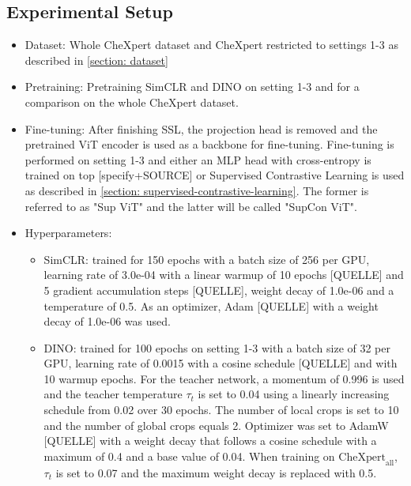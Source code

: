 \subsection{Experimental Setup}
\begin{itemize}
	\item Dataset: Whole CheXpert dataset \citep{Irvin2019} and CheXpert restricted to settings 1-3 as described in \ref{section: dataset}\\
	\item Pretraining: Pretraining SimCLR and DINO on setting 1-3 and for a comparison on the whole CheXpert dataset.\\ 
	\item Fine-tuning: After finishing SSL, the projection head is removed and the pretrained ViT encoder is used as a backbone for fine-tuning.
	Fine-tuning is performed on setting 1-3 and either an MLP head with cross-entropy is trained on top [specify+SOURCE] or Supervised Contrastive Learning is used as described in \ref{section: supervised-contrastive-learning}.
	The former is referred to as "Sup ViT" and the latter will be called "SupCon ViT".\\
	\item Hyperparameters: 
		\begin{itemize}
			\item SimCLR: trained for 150 epochs with a batch size of 256 per GPU, learning rate of 3.0e-04 with a linear warmup of 10 epochs [QUELLE] and 5 gradient accumulation steps [QUELLE], weight decay of 1.0e-06 and a temperature of 0.5. 
			As an optimizer, Adam [QUELLE] with a weight decay of 1.0e-06 was used.
		\end{itemize}
		\begin{itemize}
			\item DINO: trained for 100 epochs on setting 1-3 with a batch size of 32 per GPU, learning rate of 0.0015 with a cosine schedule [QUELLE] and with 10 warmup epochs.
			For the teacher network, a momentum of 0.996 is used and the teacher temperature $\tau_t$ is set to 0.04 using a linearly increasing schedule from 0.02 over 30 epochs.
			The number of local crops is set to 10 and the number of global crops equals 2. 
			Optimizer was set to AdamW [QUELLE] with a weight decay that follows a cosine schedule with a maximum of 0.4 and a base value of 0.04.
			When training on $\text{CheXpert}_\text{all}$, $\tau_t$ is set to 0.07 and the maximum weight decay is replaced with 0.5.
		\end{itemize}
		\begin{itemize}

\end{itemize}
\end{itemize}
